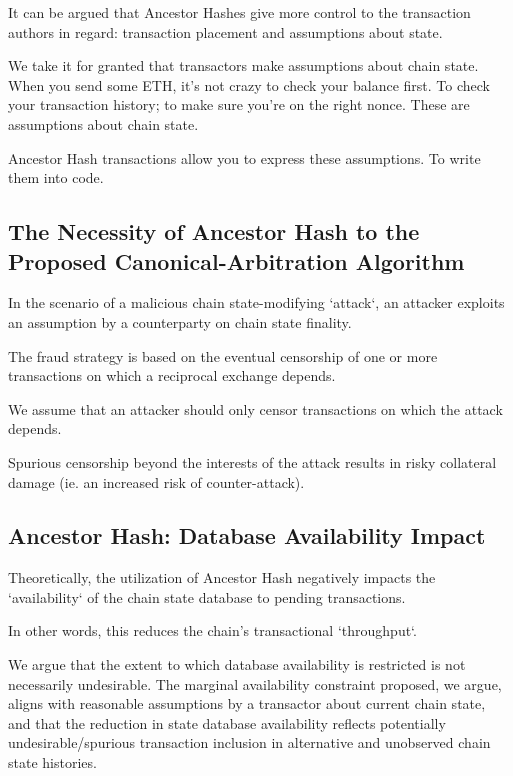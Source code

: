\documentclass[11pt]{article}
\theoremstyle{plain}
\begin{document}
It can be argued that Ancestor Hashes give more control to the transaction
authors in regard: transaction placement and assumptions about state.

We take it for granted that transactors make assumptions about chain state.
When you send some ETH, it's not crazy to check your balance first. To check
your transaction history; to make sure you're on the right nonce.
These are assumptions about chain state. 

Ancestor Hash transactions allow you to express these assumptions. To write
them into code.

\subsection{\small{The Necessity of Ancestor Hash to the Proposed
Canonical-Arbitration Algorithm}}\label{sec: S2.1}

In the scenario of a malicious chain state-modifying `attack`, an attacker
exploits an assumption by a counterparty on chain state finality.

The fraud strategy is based on the eventual censorship of one or more
transactions on which a reciprocal exchange depends.

We assume that an attacker should only censor transactions on which the attack
depends.

Spurious censorship beyond the interests of the attack results in risky
collateral damage (ie. an increased risk of counter-attack).


\subsection{\small{Ancestor Hash: Database Availability Impact}}\label{sec:
S2.1}

Theoretically, the utilization of Ancestor Hash negatively impacts the
`availability` of the chain state database to pending transactions.

In other words, this reduces the chain's transactional `throughput`.

We argue that the extent to which database availability is restricted is not
necessarily undesirable.
The marginal availability constraint proposed, we argue, aligns with reasonable
assumptions by a transactor about current chain state,
and that the reduction in state database availability reflects potentially
undesirable/spurious transaction inclusion in alternative
and unobserved chain state histories.
\end{document}
